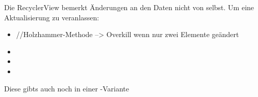 Die RecyclerView bemerkt Änderungen an den Daten nicht von selbst. Um eine Aktualisierung zu veranlassen:
\begin{itemize}
  \item {} //Holzhammer-Methode --> Overkill wenn nur zwei Elemente geändert
  \item {}
  \item {}
  \item {}
\end{itemize}
Diese gibts auch noch in einer -Variante

